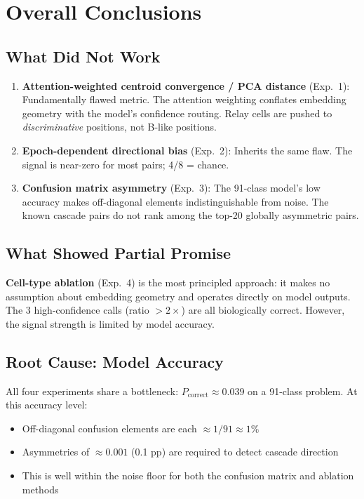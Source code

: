 \documentclass[11pt,a4paper]{article}
\begin{document}
\section{Overall Conclusions}

\subsection{What Did Not Work}

\begin{enumerate}
    \item \textbf{Attention-weighted centroid convergence / PCA distance} (Exp.\ 1):
    Fundamentally flawed metric. The attention weighting conflates embedding
    geometry with the model's confidence routing. Relay cells are pushed to
    \emph{discriminative} positions, not B-like positions.

    \item \textbf{Epoch-dependent directional bias} (Exp.\ 2): Inherits the
    same flaw. The signal is near-zero for most pairs; 4/8 = chance.

    \item \textbf{Confusion matrix asymmetry} (Exp.\ 3): The 91-class model's
    low accuracy makes off-diagonal elements indistinguishable from noise.
    The known cascade pairs do not rank among the top-20 globally asymmetric pairs.
\end{enumerate}

\subsection{What Showed Partial Promise}

\textbf{Cell-type ablation} (Exp.\ 4) is the most principled approach:
it makes no assumption about embedding geometry and operates directly on model
outputs. The 3 high-confidence calls (ratio $>2\times$) are all biologically
correct. However, the signal strength is limited by model accuracy.

\subsection{Root Cause: Model Accuracy}

All four experiments share a bottleneck: $P_{\text{correct}} \approx 0.039$
on a 91-class problem. At this accuracy level:
\begin{itemize}[noitemsep]
    \item Off-diagonal confusion elements are each $\approx 1/91 \approx 1\%$
    \item Asymmetries of $\approx 0.001$ (0.1 pp) are required to detect cascade direction
    \item This is well within the noise floor for both the confusion matrix and ablation methods
\end{itemize}
\end{document}
